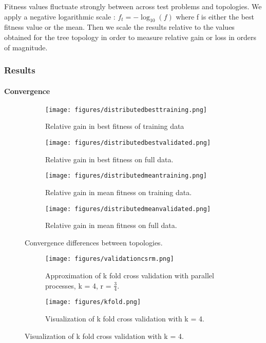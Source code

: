 Fitness values fluctuate strongly between across test problems and topologies. We apply a negative logarithmic scale : $f_t = -\log_{10}(f)$ where f is either the best fitness value or the mean. Then we scale the results relative to the values obtained for the tree topology in order to measure relative gain or loss in orders of magnitude.

\subsubsection{Results}
\paragraph{Convergence}
\begin{figure*}
    \centering
    \begin{subfigure}{0.5\textwidth}
    \centering
        \texttt{[image: figures/distributedbesttraining.png]}
        \caption{Relative gain in best fitness of training data}
    \end{subfigure}%
    \begin{subfigure}{0.5\textwidth}
    \centering
        \texttt{[image: figures/distributedbestvalidated.png]}
        \caption{Relative gain in best fitness on full data.}
    \end{subfigure}
        \begin{subfigure}{0.5\textwidth}
    \centering
        \texttt{[image: figures/distributedmeantraining.png]}
        \caption{Relative gain in mean fitness on training data.}
    \end{subfigure}%
    \begin{subfigure}{0.5\textwidth}
    \centering
        \texttt{[image: figures/distributedmeanvalidated.png]}
        \caption{Relative gain in mean fitness on full data.}
    \end{subfigure}
    \caption{Convergence differences between topologies.}
    \label{fig:distributedresults}
\end{figure*}
\begin{figure}
	\begin{subfigure}{0.5\textwidth}\label{fig:csrmkfold}
    \texttt{[image: figures/validationcsrm.png]}
    \caption{Approximation of k fold cross validation with parallel processes, k = 4,  r = $\frac{3}{4}$.}
    \end{subfigure}
	\begin{subfigure}{0.5\textwidth}    \label{fig:kfold}

    \centering
    \texttt{[image: figures/kfold.png]}
    \caption{Visualization of k fold cross validation with k = 4.}
    \end{subfigure}%
    \label{fig:ckfold}
 \end{figure}

